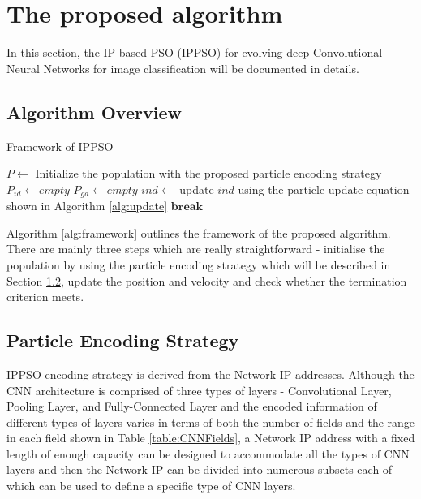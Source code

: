 \documentclass[conference]{IEEEtran}
\begin{document}
\section{The proposed algorithm}\label{sec:ProposedAlgorithm}
In this section, the IP based PSO (IPPSO) for evolving deep Convolutional Neural Networks for image classification will be documented in details. 


\subsection{Algorithm Overview}
\begin{algorithm}
	\caption{Framework of IPPSO}
	\label{alg:framework}
	\begin{algorithmic}
		\renewcommand{\algorithmicrequire}{\textbf{Input:}}
		\renewcommand{\algorithmicensure}{\textbf{Output:}}
		\STATE $P \leftarrow$ Initialize the population with the proposed particle encoding strategy
		\STATE $P_{id} \leftarrow empty$
		\STATE $P_{gd} \leftarrow empty$
				\STATE $ind \leftarrow$ update $ind$ using the particle update equation shown in Algorithm \ref{alg:update}
					\STATE $\textbf{break}$
				\ENDIF
			\ENDFOR
		\ENDWHILE		
	\end{algorithmic}
\end{algorithm}

Algorithm \ref{alg:framework} outlines the framework of the proposed algorithm. There are mainly three steps which are really straightforward - initialise the population by using the particle encoding strategy which will be described in Section \ref{sec:ParticleEncodingStrategy}, update the position and velocity and check whether the termination criterion meets.

\subsection{Particle Encoding Strategy}\label{sec:ParticleEncodingStrategy}
IPPSO encoding strategy is derived from the Network IP addresses. Although the CNN architecture is comprised of three types of layers - Convolutional Layer, Pooling Layer, and Fully-Connected Layer and the encoded information of different types of layers varies in terms of both the number of fields and the range in each field shown in Table \ref{table:CNNFields}, a Network IP address with a fixed length of enough capacity can be designed to accommodate all the types of CNN layers and then the Network IP can be divided into numerous subsets each of which can be used to define a specific type of CNN layers. 
\end{document}

